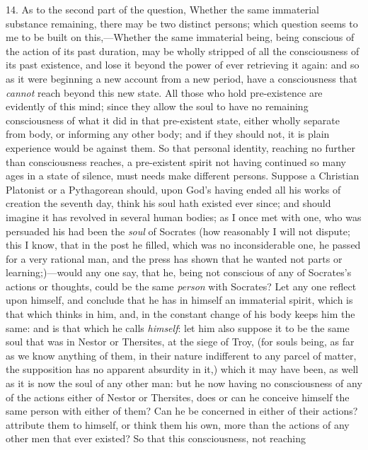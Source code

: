 14. As to the second part of the question, Whether the same
immaterial substance remaining, there may be two distinct persons;
which question seems to me to be built on this,---Whether the same
immaterial being, being conscious of the action of its past duration,
may be wholly stripped of all the consciousness of its past existence,
and lose it beyond the power of ever retrieving it again: and so as it
were beginning a new account from a new period, have a consciousness
that \textit{cannot} reach beyond this new state. All those who hold
pre-existence are evidently of this mind; since they allow the soul to
have no remaining consciousness of what it did in that pre-existent
state, either wholly separate from body, or informing any other body;
and if they should not, it is plain experience would be against them.
So that personal identity, reaching no further than consciousness
reaches, a pre-existent spirit not having continued so many ages in a
state of silence, must needs make different persons. Suppose a
Christian Platonist or a Pythagorean should, upon God's having ended
all his works of creation the seventh day, think his soul hath existed
ever since; and should imagine it has revolved in several human
bodies; as I once met with one, who was persuaded his had been the
\textit{soul} of Socrates (how reasonably I will not dispute; this I
know, that in the post he filled, which was no inconsiderable one, he
passed for a very rational man, and the press has shown that he wanted
not parts or learning;)---would any one say, that he, being not
conscious of any of Socrates's actions or thoughts, could be the same
\textit{person} with Socrates? Let any one reflect upon himself, and
conclude that he has in himself an immaterial spirit, which is that
which thinks in him, and, in the constant  change of his
body keeps him the same: and is that which he calls \textit{himself}:
let him also suppose it to be the same soul that was in Nestor or
Thersites, at the siege of Troy, (for souls being, as far as we know
anything of them, in their nature indifferent to any parcel of matter,
the supposition has no apparent absurdity in it,) which it may have
been, as well as it is now the soul of any other man: but he now
having no consciousness of any of the actions either of Nestor or
Thersites, does or can he conceive himself the same person with either
of them? Can he be concerned in either of their actions? attribute
them to himself, or think them his own, more than the actions of any
other men that ever existed? So that this consciousness, not reaching
